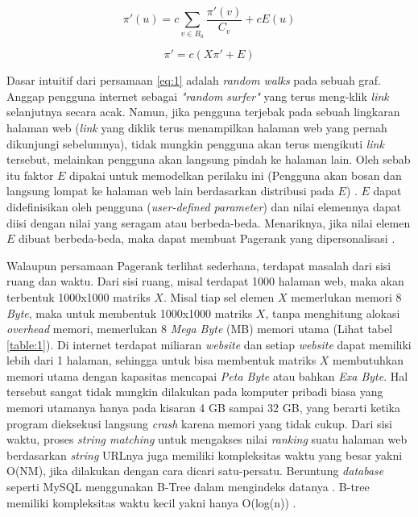 \documentclass[
	a4paper, %
	12pt, %
	unnumberedsections, %
	twoside, %
]{LTJournalArticle}
\begin{document}
\begin{equation}
	\label{eq:1}
	\pi'(u) = c\sum_{v\in B_u} \frac{\pi'(v)}{C_v} + cE(u)
\end{equation}

\begin{equation}
	\label{eq:2}
	\pi'=c(X\pi' + E)
\end{equation}

Dasar intuitif dari persamaan \ref{eq:1} adalah \textit{random walks} pada sebuah graf. Anggap pengguna internet sebagai \textit{"random surfer"} yang terus meng-klik \textit{link} selanjutnya secara acak. Namun, jika pengguna terjebak pada sebuah lingkaran halaman web (\textit{link} yang diklik terus menampilkan halaman web yang pernah dikunjungi sebelumnya), tidak mungkin pengguna akan terus mengikuti \textit{link} tersebut, melainkan pengguna akan langsung pindah ke halaman lain. Oleh sebab itu faktor $E$ dipakai untuk memodelkan perilaku ini (Pengguna akan bosan dan langsung lompat ke halaman web lain berdasarkan distribusi pada $E$) \citep{ilprints422}. $E$ dapat didefinisikan oleh pengguna (\textit{user-defined parameter}) dan nilai elemennya dapat diisi dengan nilai yang seragam atau berbeda-beda. Menariknya, jika nilai elemen $E$ dibuat berbeda-beda, maka dapat membuat Pagerank yang dipersonalisasi \citep{ilprints422}.

Walaupun persamaan Pagerank terlihat sederhana, terdapat masalah dari sisi ruang dan waktu. Dari sisi ruang, misal terdapat 1000 halaman web, maka akan terbentuk 1000x1000 matriks $X$. Misal tiap sel elemen $X$ memerlukan memori 8 \textit{Byte}, maka untuk membentuk 1000x1000 matriks $X$, tanpa menghitung alokasi \textit{overhead} memori, memerlukan 8 \textit{Mega Byte} (MB) memori utama (Lihat tabel \ref{table:1}). Di internet terdapat miliaran \textit{website} dan setiap \textit{website} dapat memiliki lebih dari 1 halaman, sehingga untuk bisa membentuk matriks $X$ membutuhkan memori utama dengan kapasitas mencapai \textit{Peta Byte} atau bahkan \textit{Exa Byte}. Hal tersebut sangat tidak mungkin dilakukan pada komputer pribadi biasa yang memori utamanya hanya pada kisaran 4 GB sampai 32 GB, yang berarti ketika program dieksekusi langsung \textit{crash} karena memori yang tidak cukup. Dari sisi waktu, proses \textit{string matching} untuk mengakses nilai \textit{ranking} suatu halaman web berdasarkan \textit{string} URLnya juga memiliki kompleksitas waktu yang besar yakni O(NM), jika dilakukan dengan cara dicari satu-persatu. Beruntung \textit{database} seperti MySQL menggunakan B-Tree dalam mengindeks datanya \citep{mysqlIndex}. B-tree memiliki kompleksitas waktu kecil yakni hanya O(log(n)) \citep{geeksForGeeksBtree}.
\end{document}
